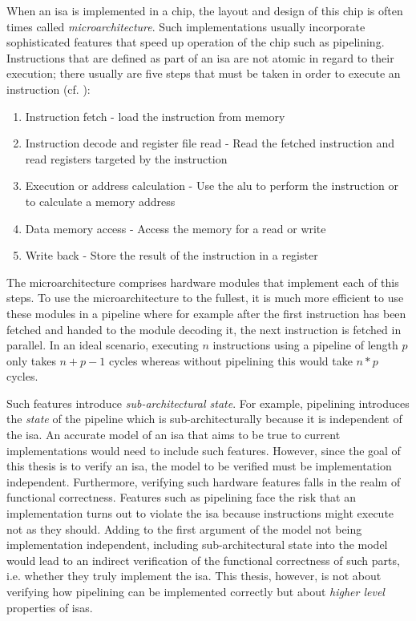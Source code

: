 When an \gls{isa} is implemented in a chip, the layout and design of this chip is often times called \textit{microarchitecture}.
Such implementations usually incorporate sophisticated features that speed up operation of the chip such as pipelining.
Instructions that are defined as part of an \gls{isa} are not atomic in regard to their execution; there usually are five steps that must be taken in order to execute an instruction (cf. \cite[p.286]{Patterson13}):
\begin{enumerate}
    \item Instruction fetch - load the instruction from memory
    \item Instruction decode and register file read - Read the fetched instruction and read registers targeted by the instruction
    \item Execution or address calculation - Use the \gls{alu} to perform the instruction or to calculate a memory address
    \item Data memory access - Access the memory for a read or write
    \item Write back - Store the result of the instruction in a register
\end{enumerate}
The microarchitecture comprises hardware modules that implement each of this steps.
To use the microarchitecture to the fullest, it is much more efficient to use these modules in a pipeline where for example after the first instruction has been fetched and handed to the module decoding it, the next instruction is fetched in parallel.
In an ideal scenario, executing $ n $ instructions using a pipeline of length $ p $ only takes $ n + p - 1 $ cycles whereas without pipelining this would take $ n * p $ cycles.

Such features introduce \textit{sub-architectural state}.
For example, pipelining introduces the \textit{state} of the pipeline which is sub-architecturally because it is independent of the \gls{isa}.
An accurate model of an \gls{isa} that aims to be true to current implementations would need to include such features.
However, since the goal of this thesis is to verify an \gls{isa}, the model to be verified must be implementation independent.
Furthermore, verifying such hardware features falls in the realm of functional correctness.
Features such as pipelining face the risk that an implementation turns out to violate the \gls{isa} because instructions might execute not as they should.
Adding to the first argument of the model not being implementation independent, including sub-architectural state into the model would lead to an indirect verification of the functional correctness of such parts, i.e. whether they truly implement the \gls{isa}.
This thesis, however, is not about verifying how pipelining can be implemented correctly but about \textit{higher level} properties of \glspl{isa}.

